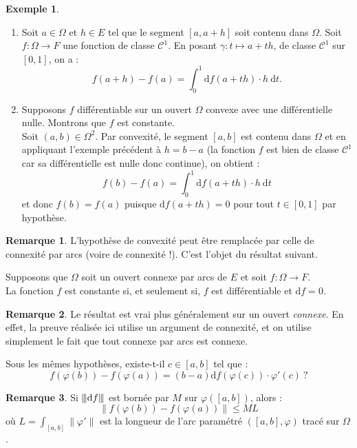 \documentclass[french]{article}
\newcommand{\vertiii}[1]{{\left\vert\kern-0.25ex\left\vert\kern-0.25ex\left\vert #1 \right\vert\kern-0.25ex\right\vert\kern-0.25ex\right\vert}}
\renewcommand{\d}{\text{d}}
\theoremstyle{plain}
\theoremstyle{definition}
\newtheorem*{ex}{Exemple}
\newtheorem*{rmq}{Remarque}
\theoremstyle{remark}
\begin{document}
\begin{ex}
	\begin{enumerate}
		\item Soit $a\in\Omega$ et $h\in E$ tel que le segment $[a,a+h]$ soit contenu dans $\Omega$. Soit $f:\Omega\to F$ une fonction de classe $\mathcal{C}^1$. En posant $\gamma :t\mapsto a+th$, de classe $\mathcal{C}^1$ sur $[0,1]$, on a :
		$$f(a+h)-f(a)=\int_{0}^{1}\d f(a+th)\cdot h\ \d t.$$
		\item Supposons $f$ différentiable sur un ouvert $\Omega$ convexe avec une différentielle nulle. Montrons que $f$ est constante. \\
		Soit $(a,b)\in\Omega^2$. Par convexité, le segment $[a,b]$ est contenu dans $\Omega$ et en appliquant l'exemple précédent à $h=b-a$ (la fonction $f$ est bien de classe $\mathcal{C}^1$ car sa différentielle est nulle donc continue), on obtient :
		$$f(b)-f(a)=\int_{0}^{1}\d f(a+th)\cdot h\ \d t$$ et donc $f(b)=f(a)$ puisque $\d f(a+th)=0$ pour tout $t\in[0,1]$ par hypothèse.
	\end{enumerate}
\end{ex}

\begin{rmq}
	L'hypothèse de convexité peut être remplacée par celle de connexité par arcs (voire de connexité !). C'est l'objet du résultat suivant.
\end{rmq}

\begin{prop}%
	Supposons que $\Omega$ soit un ouvert connexe par arcs de $E$ et soit $f:\Omega\to F$. \\
	La fonction $f$ est constante si, et seulement si, $f$ est différentiable et $\d f=0$.
\end{prop}
\begin{rmq}
	Le résultat est vrai plus généralement sur un ouvert \textit{connexe}. En effet, la preuve réalisée ici utilise un argument de connexité, et on utilise simplement le fait que tout connexe par arcs est connexe.
\end{rmq}

\begin{exo}
	Sous les mêmes hypothèses, existe-t-il $c\in[a,b]$ tel que :
	$$f(\varphi(b))-f(\varphi(a))=(b-a)\d f(\varphi(c))\cdot\varphi'(c)\ ?$$
\end{exo}

\begin{rmq}
	Si $\vertiii{\d f}$ est bornée par $M$ sur $\varphi([a,b])$, alors : $$\lVert f(\varphi(b))-f(\varphi(a))\rVert\leqslant ML$$ où $L=\displaystyle\int_{[a,b]}\lVert\varphi'\rVert$ est la longueur de l'arc paramétré $([a,b],\varphi)$ tracé sur $\Omega$.
\end{rmq}
\end{document}
